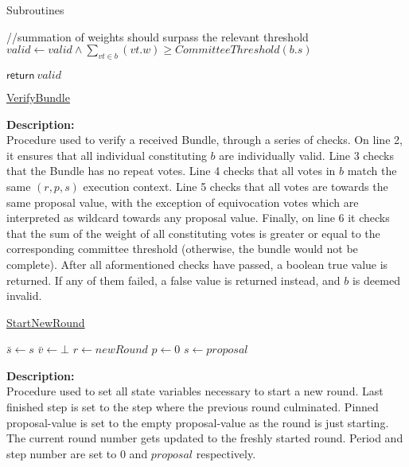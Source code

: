 \documentclass[10pt,a4paper]{article}
\begin{document}
\begin{section}{Subroutines}
\begin{algorithm}[H]
\begin{algorithmic}[1]
    //summation of weights should surpass the relevant threshold
    \State $valid \gets valid \land  \sum_{vt \in b}(vt.w) \geq CommitteeThreshold(b.s)$

    \State $\mathsf{return} \ valid$

    \EndFunction
    \end{algorithmic}
    \caption{\underline{VerifyBundle}}
\end{algorithm}

\noindent \textbf{Description:}\\
Procedure used to verify a received Bundle, through a series 
of checks.
On line 2, it ensures that all individual constituting $b$
are individually valid.
Line 3 checks that the Bundle has no repeat votes.
Line 4 checks that all votes in $b$ match the same $(r,p,s)$
execution context.
Line 5 checks that all votes are towards the same proposal value,
with the exception of equivocation votes which are interpreted as wildcard
towards any proposal value.
Finally, on line 6 it checks that the sum of the weight of all constituting
votes is greater or equal to the corresponding committee threshold (otherwise, 
the bundle would not be complete).
After all aformentioned checks have passed, a boolean true value is returned.
If any of them failed, a false value is returned instead, and $b$ is deemed invalid.


\begin{algorithm}[H]\label{algo:start-new-round}
    \caption{\underline{StartNewRound}}
    \label{algo:start-new-round}
    \begin{algorithmic}[1]
    \State $\bar{s} \gets s$
    \State $\bar{v} \gets \bot$
    \State $r \gets newRound$
    \State $p \gets 0$
    \State $s \gets proposal$
    \EndFunction
    \end{algorithmic}
\end{algorithm}

\noindent \textbf{Description:}\\
Procedure used to set all state variables necessary to start a new round.
Last finished step is set to the step where the previous round culminated.
Pinned proposal-value is set to the empty proposal-value as the round is just starting.
The current round number gets updated to the freshly started round.
Period and step number are set to $0$ and $proposal$ respectively.


\end{section}
\end{document}
